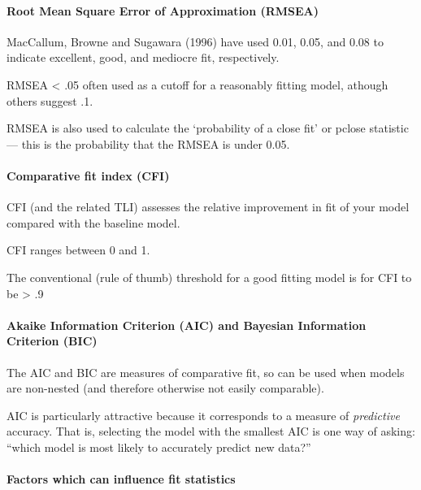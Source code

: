\documentclass[]{article}
\let\oldparagraph\paragraph
\renewcommand{\paragraph}[1]{\oldparagraph{#1}\mbox{}}
\theoremstyle{definition}
\theoremstyle{definition}
\theoremstyle{definition}
\theoremstyle{remark}
\begin{document}
\paragraph{Root Mean Square Error of Approximation
(RMSEA)}\label{root-mean-square-error-of-approximation-rmsea}

MacCallum, Browne and Sugawara (1996) have used 0.01, 0.05, and 0.08 to
indicate excellent, good, and mediocre fit, respectively.

RMSEA \textless{} .05 often used as a cutoff for a reasonably fitting
model, athough others suggest .1.

RMSEA is also used to calculate the `probability of a close fit' or
pclose statistic --- this is the probability that the RMSEA is under
0.05.

\paragraph{Comparative fit index (CFI)}\label{comparative-fit-index-cfi}

CFI (and the related TLI) assesses the relative improvement in fit of
your model compared with the baseline model.

CFI ranges between 0 and 1.

The conventional (rule of thumb) threshold for a good fitting model is
for CFI to be \textgreater{} .9

\paragraph{Akaike Information Criterion (AIC) and Bayesian Information
Criterion
(BIC)}\label{akaike-information-criterion-aic-and-bayesian-information-criterion-bic}

The AIC and BIC are measures of comparative fit, so can be used when
models are non-nested (and therefore otherwise not easily comparable).

AIC is particularly attractive because it corresponds to a measure of
\emph{predictive} accuracy. That is, selecting the model with the
smallest AIC is one way of asking: ``which model is most likely to
accurately predict new data?''

\paragraph{Factors which can influence fit
statistics}\label{factors-which-can-influence-fit-statistics}
\end{document}
